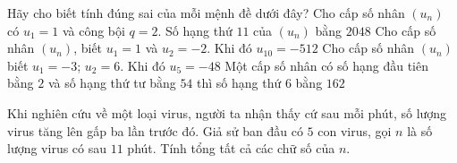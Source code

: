 \begin{ex}%
 Hãy cho biết tính  đúng sai của mỗi mệnh đề dưới đây?
 \choiceTF 
  {Cho cấp số  nhân $(u_n)$ có $u_1=1$ và công bội $q=2$. Số hạng thứ $11$ của $(u_n)$ bằng $2048$}
  {\True Cho cấp số nhân $\left(u_n\right)$, biết $u_1=1$ và $u_2=-2$.  Khi đó $u_{10}=-512$}
  {\True Cho cấp số nhân  $(u_n)$ biết $u_1=-3$; $u_2=6$. Khi đó $u_5=-48$}
  {Một cấp số nhân có số hạng đầu tiên bằng  $2$ và số hạng thứ tư bằng $54$ thì số hạng thứ $6$ bằng $162$}
\end{ex}



\begin{ex}%
	Khi nghiên cứu về một loại virus, người ta nhận thấy cứ sau mỗi phút, số  lượng virus tăng lên gấp ba lần trước đó. Giả sử ban đầu có $5$ con virus, gọi $n$ là số lượng virus có sau $11$ phút. Tính tổng tất cả các chữ số của $n$.
\end{ex}

